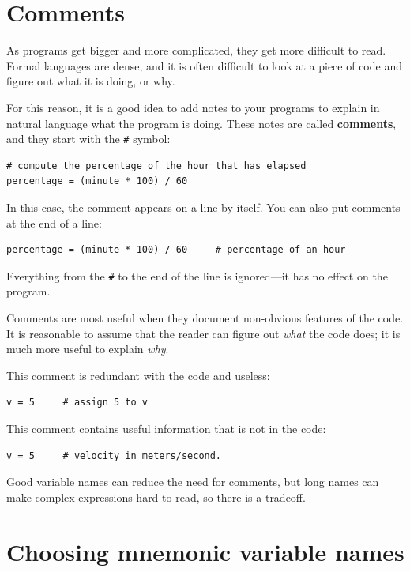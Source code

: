\documentclass[10pt]{book}
\begin{document}


\section{Comments}

As programs get bigger and more complicated, they get more difficult
to read.  Formal languages are dense, and it is often difficult to
look at a piece of code and figure out what it is doing, or why.

For this reason, it is a good idea to add notes to your programs to explain
in natural language what the program is doing.  These notes are called
{\bf comments}, and they start with the \verb"#" symbol:

\beforeverb
\begin{verbatim}
# compute the percentage of the hour that has elapsed
percentage = (minute * 100) / 60
\end{verbatim}
\afterverb
%
In this case, the comment appears on a line by itself.  You can also put
comments at the end of a line:

\beforeverb
\begin{verbatim}
percentage = (minute * 100) / 60     # percentage of an hour
\end{verbatim}
\afterverb
%
Everything from the {\tt \#} to the end of the line is ignored---it
has no effect on the program.

Comments are most useful when they document non-obvious features of
the code.  It is reasonable to assume that the reader can figure out
\emph{what} the code does; it is much more useful to explain \emph{why}.

This comment is redundant with the code and useless:

\beforeverb
\begin{verbatim}
v = 5     # assign 5 to v
\end{verbatim}
\afterverb
%
This comment contains useful information that is not in the code:

\beforeverb
\begin{verbatim}
v = 5     # velocity in meters/second. 
\end{verbatim}
\afterverb
%
Good variable names can reduce the need for comments, but
long names can make complex expressions hard to read, so there is
a tradeoff.

\section{Choosing mnemonic variable names}
\end{document}
